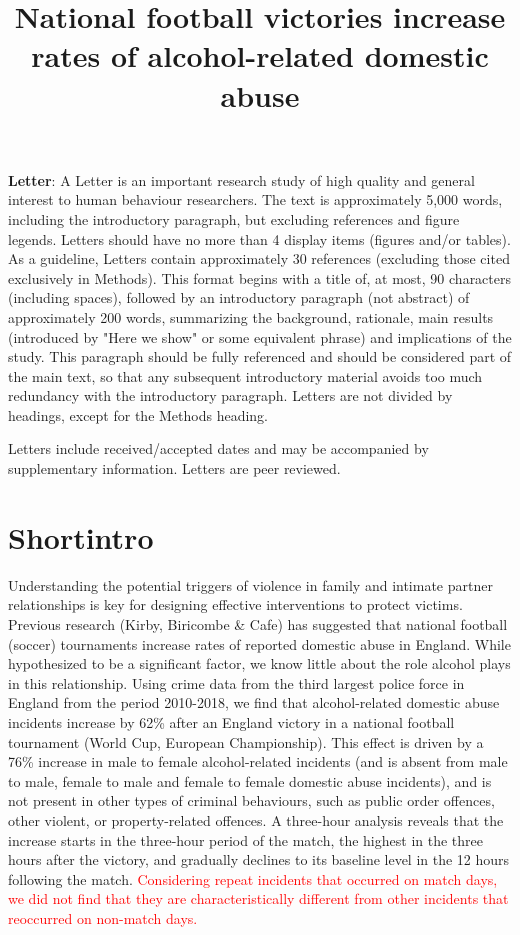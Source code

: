\documentclass[12pt, letterpaper]{article}
\begin{document}
\title{National football victories increase rates of alcohol-related domestic abuse}
\textbf{Letter}:
A Letter is an important research study of high quality and general interest to human behaviour researchers.  The text is approximately 5,000 words, including the introductory paragraph, but excluding references and figure legends. Letters should have no more than 4 display items (figures and/or tables). As a guideline, Letters contain approximately 30 references (excluding those cited exclusively in Methods). This format begins with a title of, at most, 90 characters (including spaces), followed by an introductory paragraph (not abstract) of approximately 200 words, summarizing the background, rationale, main results (introduced by "Here we show" or some equivalent phrase) and implications of the study. This paragraph should be fully referenced and should be considered part of the main text, so that any subsequent introductory material avoids too much redundancy with the introductory paragraph. Letters are not divided by headings, except for the Methods heading.

Letters include received/accepted dates and may be accompanied by supplementary information. Letters are peer reviewed.


\maketitle

\section{Shortintro}

Understanding the potential triggers of violence in family and intimate partner relationships is key for designing effective interventions to protect victims. Previous research (Kirby, Biricombe \& Cafe) has suggested that national football (soccer) tournaments increase rates of reported domestic abuse in England. While hypothesized to be a significant factor, we know little about the role alcohol plays in this relationship. Using crime data from the third largest police force in England from the period 2010-2018, we find that alcohol-related domestic abuse incidents increase by 62\% after an England victory in a national football tournament (World Cup, European Championship). This effect is driven by a 76\% increase in male to female alcohol-related incidents (and is absent from male to male, female to male and female to female domestic abuse incidents), and is not present in other types of criminal behaviours, such as public order offences, other violent, or property-related offences. A three-hour analysis reveals that the increase starts in the three-hour period of the match, the highest in the three hours after the victory, and gradually declines to its baseline level in the 12 hours following the match. \textcolor{red}{Considering repeat incidents that occurred on match days, we did not find that they are characteristically different from other incidents that reoccurred on non-match days.}
\end{document}
